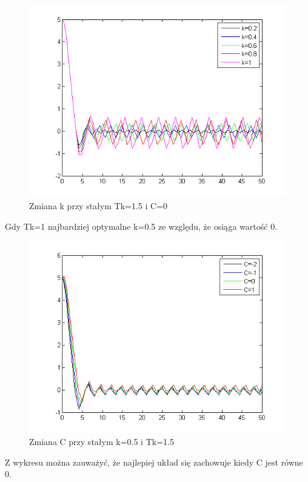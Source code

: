 \documentclass[a4paper,10pt]{article}
\begin{document}
\begin{enumerate}
\begin{figure}[!h]
    \centering
	\includegraphics[width=120mm]{CW3-korekcja-dwupolozeniowy-e_k.png}
	\caption{Zmiana k przy stałym Tk=1.5 i C=0}
    \label{fig:Rysunek}
\end{figure}
Gdy Tk=1 najbardziej optymalne k=0.5 ze względu, że osiąga wartość 0.
\begin{figure}[!h]
    \centering
	\includegraphics[width=120mm]{CW3-korekcja-dwupolozeniowy-e_C_k1T1.png}
	\caption{Zmiana C przy stałym k=0.5 i Tk=1.5}
    \label{fig:Rysunek}
\end{figure}
Z wykresu można zauważyć, że najlepiej układ się zachowuje kiedy C jest równe 0.


\end{enumerate}
\end{document}
